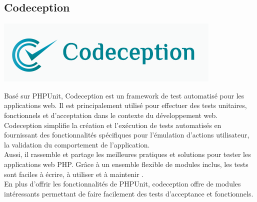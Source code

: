 		\subsection{Codeception}
			\begin{center}
				\includegraphics[scale=1]{chap_3/codeception.png}
				\label{Codeception}
				\cite{codeception_image}
			\end{center}
		Basé sur PHPUnit, Codeception est un framework de test automatisé pour les applications web. Il est principalement utilisé pour effectuer des tests unitaires, fonctionnels et d'acceptation dans le contexte du développement web. Codeception simplifie la création et l'exécution de tests automatisés en fournissant des fonctionnalités spécifiques pour l'émulation d'actions utilisateur, la validation du comportement de l'application.\\
		Aussi, il rassemble et partage les meilleures pratiques et solutions pour tester les applications web PHP. Grâce à un ensemble flexible de modules inclus, les tests sont faciles à écrire, à utiliser et à maintenir \cite{codeception}.\\
		En plus d'offrir les fonctionnalités de PHPUnit, codeception offre de modules intéressants permettant de faire facilement des tests d'acceptance et fonctionnels.
		

